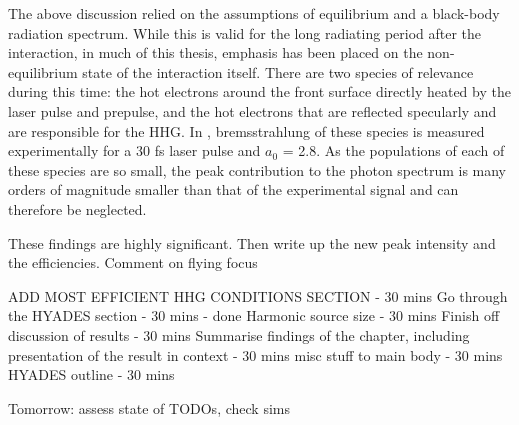The above discussion relied on the assumptions of equilibrium and a black-body radiation spectrum.
While this is valid for the long radiating period after the interaction, in much of this thesis, emphasis has been placed on the non-equilibrium state of the interaction itself. There are two species of relevance during this time: the hot electrons around the front surface directly heated by the laser pulse and prepulse, and the hot electrons that are reflected specularly and are responsible for the HHG. In \cite{zulickHighResolutionBremsstrahlung2013}, bremsstrahlung of these species is measured experimentally for a 30 fs laser pulse and $a_0$ = 2.8. As the populations of each of these species are so small, the peak contribution to the photon spectrum is many orders of magnitude smaller than that of the experimental signal and can therefore be neglected.

These findings are highly significant. 
Then write up the new peak intensity and the efficiencies.
Comment on flying focus






ADD MOST EFFICIENT HHG CONDITIONS SECTION - 30 mins
Go through the HYADES section - 30 mins - done
Harmonic source size - 30 mins
Finish off discussion of results - 30 mins
Summarise findings of the chapter, including presentation of the result in context - 30 mins
misc stuff to main body - 30 mins
HYADES outline - 30 mins

Tomorrow:  assess state of TODOs, check sims